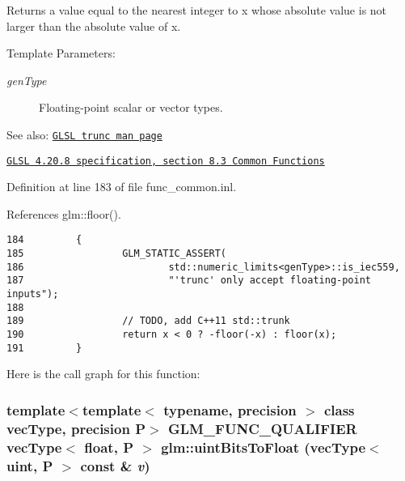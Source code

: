 Returns a value equal to the nearest integer to x whose absolute value is not larger than the absolute value of x.

\begin{Desc}
\item[Template Parameters:]
\begin{description}
\item[{\em genType}]Floating-point scalar or vector types.\end{description}
\end{Desc}
\begin{Desc}
\item[See also:]\href{http://www.opengl.org/sdk/docs/manglsl/xhtml/trunc.xml}{\tt GLSL trunc man page} 

\href{http://www.opengl.org/registry/doc/GLSLangSpec.4.20.8.pdf}{\tt GLSL 4.20.8 specification, section 8.3 Common Functions} \end{Desc}


Definition at line 183 of file func\_\-common.inl.

References glm::floor().

\begin{Code}\begin{verbatim}184         {
185                 GLM_STATIC_ASSERT(
186                         std::numeric_limits<genType>::is_iec559,
187                         "'trunc' only accept floating-point inputs");
188 
189                 // TODO, add C++11 std::trunk
190                 return x < 0 ? -floor(-x) : floor(x);
191         }
\end{verbatim}
\end{Code}




Here is the call graph for this function:\hypertarget{group__core__func__common_gda31018f0dedd22004850229eb178b0d}{
\subsubsection[uintBitsToFloat]{\setlength{\rightskip}{0pt plus 5cm}template$<$template$<$ typename, precision $>$ class vecType, precision P$>$ GLM\_\-FUNC\_\-QUALIFIER vecType$<$ float, P $>$ glm::uintBitsToFloat (vecType$<$ uint, P $>$ const \& {\em v})}}
\label{group__core__func__common_gda31018f0dedd22004850229eb178b0d}


